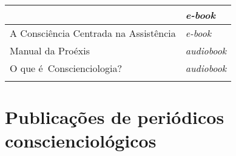\documentclass{gescons}
\begin{document}
\begin{longtable}[]{@{}
  >{\raggedright\arraybackslash}p{}
  >{\raggedright\arraybackslash}p{}@{}}
\begin{minipage}[b]{\linewidth}
\end{minipage} & \begin{minipage}[b]{\linewidth}\centering
\emph{e-book}
\end{minipage} \\
\hline
\begin{minipage}[b]{\linewidth}\raggedright
A Consciência Centrada na Assistência
\end{minipage} & \begin{minipage}[b]{\linewidth}\centering
\emph{e-book}
\end{minipage} \\
\hline
\begin{minipage}[b]{\linewidth}\raggedright
Manual da Proéxis
\end{minipage} & \begin{minipage}[b]{\linewidth}\centering
\emph{audiobook}
\end{minipage} \\
\hline
\begin{minipage}[b]{\linewidth}\raggedright
O que é~Conscienciologia?
\end{minipage} & \begin{minipage}[b]{\linewidth}\centering
\emph{audiobook}
\end{minipage} \\
\midrule\noalign{}
\endhead
\bottomrule\noalign{}
\endlastfoot
\end{longtable}

\section*{Publicações de periódicos conscienciológicos}
\end{document}
